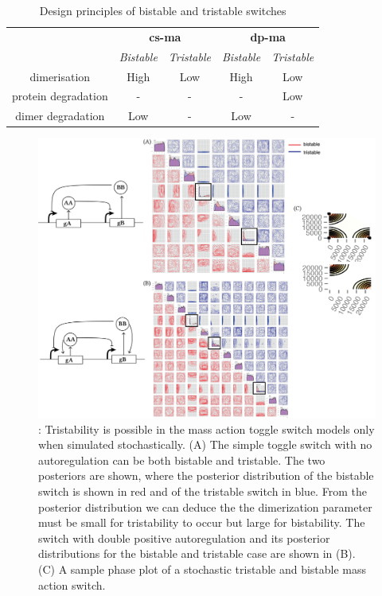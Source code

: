 \begin{table}[htbp]
\centering
\caption{Design principles of bistable and tristable switches}
\label{tab:des_prin}
\begin{tabular}{@{}ccccc@{}}
\toprule
                    & \multicolumn{2}{c}{\textbf{\acrshort{cs-ma}}} & \multicolumn{2}{c}{\textbf{\acrshort{dp-ma}}} \\ \cmidrule(l){2-3}\cmidrule(l){4-5}
                    & \textit{Bistable}    & \textit{Tristable}   & \textit{Bistable}    & \textit{Tristable}   \\\cmidrule(l){2-2}\cmidrule(l){3-3}\cmidrule(l){4-4}\cmidrule(l){5-5}
dimerisation        & High        & Low         & High        & Low         \\
protein degradation & -           & -           & -           & Low         \\
dimer degradation   & Low         & -           & Low         & -           \\\bottomrule
\end{tabular}
\end{table}


\begin{figure}[htbp]
\centerfloat
\includegraphics[scale=0.5]{../../chapters/chapterStabilityFinder/images/MA_stoch_design_princ.png}
\caption[Multistability in the stochastic mass action models]{ \label{fig:fig7}: Tristability is possible in the mass action toggle switch models only when simulated stochastically. (A) The simple toggle switch with no autoregulation can be both bistable and tristable. The two posteriors are shown, where the posterior distribution of the bistable switch is shown in red and of the tristable switch in blue. From the posterior distribution we can deduce the the dimerization parameter must be small for tristability to occur but large for bistability. The switch with double positive autoregulation and its posterior distributions for the bistable and tristable case are shown in (B). (C) A sample phase plot of a stochastic tristable and bistable mass action switch. }
\end{figure}
\clearpage


